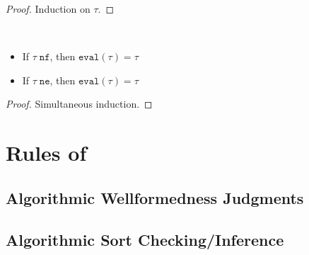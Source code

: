 \idxsubsteval*
\begin{proof}
Induction on $\tau$.
\end{proof}


\normthm*


\begin{theorem}
~\begin{itemize}
  \item If $\tau \; \texttt{nf}$, then $\texttt{eval}(\tau) = \tau$
  \item If $\tau \; \texttt{ne}$, then $\texttt{eval}(\tau) = \tau$
\end{itemize}
\label{thm:norm-idemp}
\end{theorem}
\begin{proof}
Simultaneous induction.
\end{proof}

\section{Rules of \bilambdaamor}

\subsection{Algorithmic Wellformedness Judgments}
\begin{mathpar}



\end{mathpar}

\subsection{Algorithmic Sort Checking/Inference}

